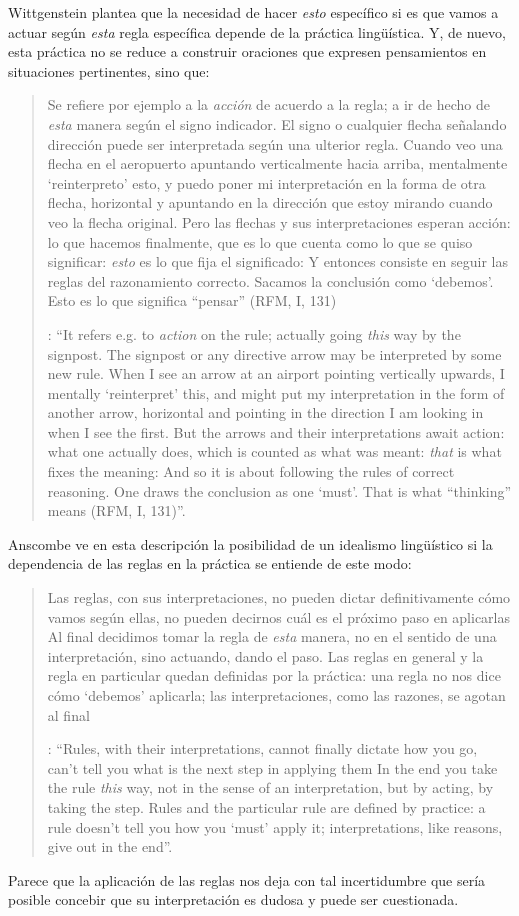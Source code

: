 Wittgenstein plantea que la necesidad de hacer \emph{esto} específico si es que vamos a actuar según \emph{esta} regla específica depende de la práctica lingüística. Y, de nuevo, esta práctica no se reduce a construir oraciones que expresen pensamientos en situaciones pertinentes, sino que: \blockquote[{\Cite[131]{anscombe1981parmenides:qli}}: \enquote{It refers e.g. to \emph{action} on the rule; actually going \emph{this} way by the signpost. The signpost or any directive arrow may be interpreted by some new rule. When I see an arrow at an airport pointing vertically upwards, I mentally `reinterpret' this, and might put my interpretation in the form of another arrow, horizontal and pointing in the direction I am looking in when I see the first. But the arrows and their interpretations await action: what one actually does, which is counted as what was meant: \emph{that} is what fixes the meaning: And so it is about following the rules of correct reasoning. One draws the conclusion as one `must'. That is what ``thinking'' means (RFM, I, 131)}.]{Se refiere por ejemplo a la \emph{acción} de acuerdo a la regla; a ir de hecho de \emph{esta} manera según el signo indicador. El signo o cualquier flecha señalando dirección puede ser interpretada según una ulterior regla. Cuando veo una flecha en el aeropuerto apuntando verticalmente hacia arriba, mentalmente `reinterpreto' esto, y puedo poner mi interpretación en la forma de otra flecha, horizontal y apuntando en la dirección que estoy mirando cuando veo la flecha original. Pero las flechas y sus interpretaciones esperan acción: lo que hacemos finalmente, que es lo que cuenta como lo que se quiso significar: \emph{esto} es lo que fija el significado: Y entonces consiste en seguir las reglas del razonamiento correcto. Sacamos la conclusión como `debemos'. Esto es lo que significa ``pensar'' (RFM, I, 131)}. Anscombe ve en esta descripción la posibilidad de un idealismo lingüístico si la dependencia de las reglas en la práctica se entiende de este modo: \blockquote[{\Cite[131]{anscombe1981parmenides:qli}}: \enquote{Rules, with their interpretations, cannot finally dictate how you go, can't tell you what is the next step in applying them \textelp{} In the end you take the rule \emph{this} way, not in the sense of an interpretation, but by acting, by taking the step. Rules and the particular rule are defined by practice: a rule doesn't tell you how you `must' apply it; interpretations, like reasons, give out in the end}.]{Las reglas, con sus interpretaciones, no pueden dictar definitivamente cómo vamos según ellas, no pueden decirnos cuál es el próximo paso en aplicarlas \textelp{} Al final decidimos tomar la regla de \emph{esta} manera, no en el sentido de una interpretación, sino actuando, dando el paso. Las reglas en general y la regla en particular quedan definidas por la práctica: una regla no nos dice cómo `debemos' aplicarla; las interpretaciones, como las razones, se agotan al final}. Parece que la aplicación de las reglas nos deja con tal incertidumbre que sería posible concebir que su interpretación es dudosa y puede ser cuestionada.
